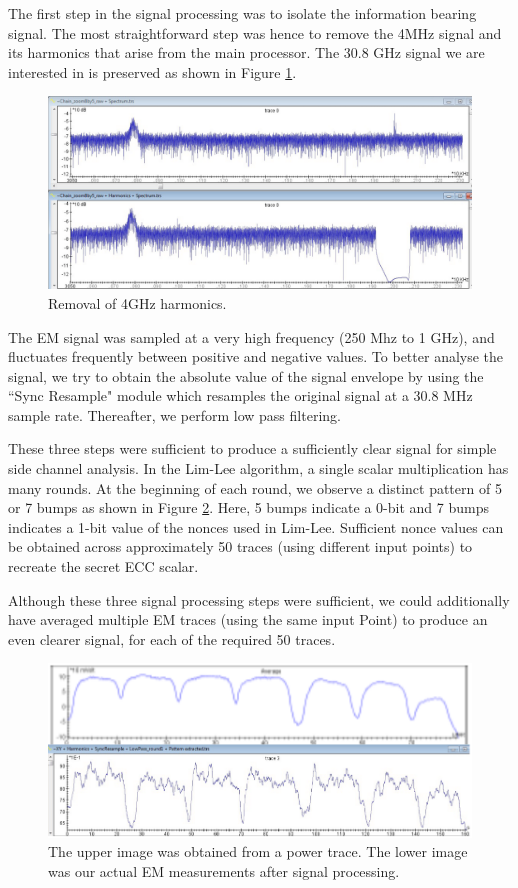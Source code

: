 
The first step in the signal processing was to isolate the information bearing signal. The most straightforward step was hence to remove the 4MHz signal and its harmonics that arise from the main processor. The 30.8 GHz signal we are interested in is preserved as shown in Figure \ref{figure:harmonics_removal}.

    \begin{figure}
      \centering
      \includegraphics[scale=0.3]{img/harmonics_removal.png}
      \caption{\label{figure:harmonics_removal}Removal of 4GHz harmonics.}
    \end{figure}  

The EM signal was sampled at a very high frequency (250 Mhz to 1 GHz), and fluctuates frequently between positive and negative values. To better analyse the signal, we try to obtain the absolute value of the signal envelope by using the ``Sync Resample" module which  resamples the original signal at a 30.8 MHz sample rate. Thereafter, we perform low pass filtering. 

These three steps were sufficient to produce a sufficiently clear signal for simple side channel analysis. In the Lim-Lee algorithm, a single scalar multiplication has many rounds. At the beginning of each round, we observe a distinct pattern of 5 or 7 bumps as shown in Figure \ref{figure:pattern}. Here, 5 bumps indicate a 0-bit and 7 bumps indicates a 1-bit value of the nonces used in Lim-Lee. Sufficient nonce values can be obtained across approximately 50 traces (using different input points) to recreate the secret ECC scalar.

Although these three signal processing steps were sufficient, we could additionally have averaged multiple EM traces (using the same  input Point) to produce an even clearer signal, for each of the required 50 traces.

    \begin{figure}
      \centering
      \includegraphics[scale=0.3]{img/pattern.png}
      \caption{\label{figure:pattern}The upper image was obtained from a power trace. The lower image was our actual EM measurements after signal processing.}
    \end{figure}  


